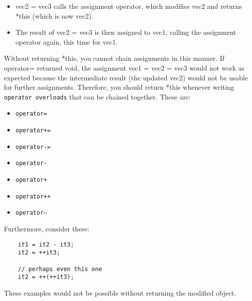 \documentclass{report}
\begin{document}
\begin{itemize}
    \item vec2 = vec3 calls the assignment operator, which modifies vec2 and returns *this (which is now vec2).
    \item The result of vec2 = vec3 is then assigned to vec1, calling the assignment operator again, this time for vec1.
\end{itemize} \noindent
Without returning *this, you cannot chain assignments in this manner. If operator= returned void, the assignment vec1 = vec2 = vec3 would not work as expected because the intermediate result (the updated vec2) would not be usable for further assignments.
\bigbreak \noindent
Therefore, you should return *this whenever writing \texttt{operator overloads} that can be chained together. These are:
\begin{itemize}
    \item \texttt{operator=}
    \item \texttt{operator+=}
    \item \texttt{operator-=}
    \item \texttt{operator-}
    \item \texttt{operator+}
    \item \texttt{operator++}
    \item \texttt{operator--}
\end{itemize}
\noindent Furthermore, consider these:
\begin{verbatim}
    it1 = it2 - it3;
    it2 = ++it3;

    // perhaps even this one
    it2 = ++(++it3);
\end{verbatim}
\noindent These examples would not be possible without returning the modified object.
\end{document}
